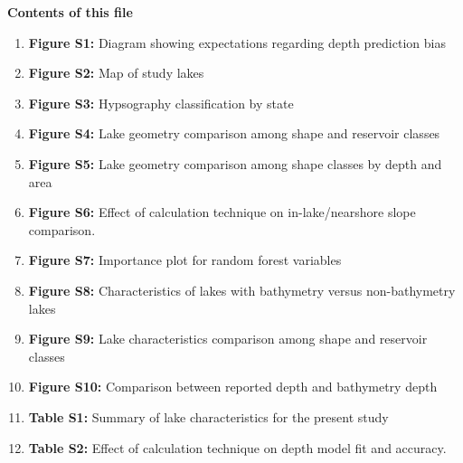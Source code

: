 \documentclass[draft,wrr]{agutexSI2019}
\begin{document}
\begin{article}

%
%



\noindent\textbf{Contents of this file}
\begin{enumerate}

\item \textbf{Figure S1:} Diagram showing expectations regarding depth prediction bias

\item \textbf{Figure S2:} Map of study lakes

\item \textbf{Figure S3:} Hypsography classification by state

\item \textbf{Figure S4:} Lake geometry comparison among shape and reservoir classes

\item \textbf{Figure S5:} Lake geometry comparison among shape classes by depth and area

\item \textbf{Figure S6:} Effect of calculation technique on in-lake/nearshore slope comparison.

\item \textbf{Figure S7:} Importance plot for random forest variables

\item \textbf{Figure S8:} Characteristics of lakes with bathymetry versus non-bathymetry lakes

\item \textbf{Figure S9:} Lake characteristics comparison among shape and reservoir classes

\item \textbf{Figure S10:} Comparison between reported depth and bathymetry depth

\item \textbf{Table S1:} Summary of lake characteristics for the present study

\item \textbf{Table S2:} Effect of calculation technique on depth model fit and accuracy.

\end{enumerate}
\vspace{1em}


\end{article}
\end{document}
